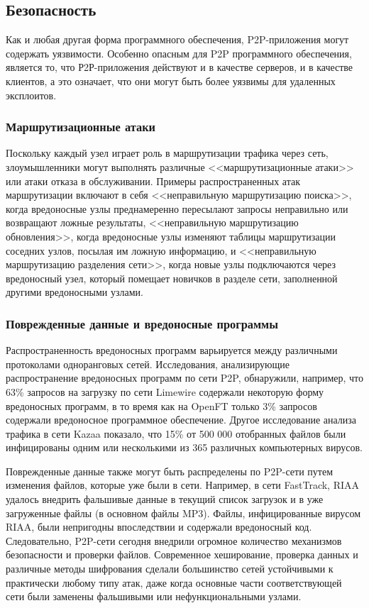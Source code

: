 \documentclass[bachelor, och, coursework]{SCWorks}
\begin{document}
\subsection{Безопасность}
Как и любая другая форма программного обеспечения, P2P-приложения могут содержать уязвимости. 
Особенно опасным для P2P программного обеспечения, является то, что Р2Р-приложения действуют и в качестве серверов, и в качестве клиентов, а это означает, что они могут быть более уязвимы для удаленных эксплоитов.

\subsubsection{Маршрутизационные атаки}
Поскольку каждый узел играет роль в маршрутизации трафика через сеть, злоумышленники могут выполнять различные <<маршрутизационные атаки>> или атаки отказа в обслуживании. Примеры распространенных атак маршрутизации включают в себя <<неправильную маршрутизацию поиска>>, когда вредоносные узлы преднамеренно пересылают запросы неправильно или возвращают ложные результаты, <<неправильную маршрутизацию обновления>>, когда вредоносные узлы изменяют таблицы маршрутизации соседних узлов, посылая им ложную информацию, и <<неправильную маршрутизацию разделения сети>>, когда новые узлы подключаются через вредоносный узел, который помещает новичков в разделе сети, заполненной другими вредоносными узлами.

\subsubsection{Поврежденные данные и вредоносные программы}
Распространенность вредоносных программ варьируется между различными протоколами одноранговых сетей. 
Исследования, анализирующие распространение вредоносных программ по сети P2P, обнаружили, например, что 63\% запросов на загрузку по сети Limewire содержали некоторую форму вредоносных программ, в то время как на OpenFT только 3\% запросов содержали вредоносное программное обеспечение. Другое исследование анализа трафика в сети Kazaa показало, что 15\% от 500 000 отобранных файлов были инфицированы одним или несколькими из 365 различных компьютерных вирусов.

Поврежденные данные также могут быть распределены по P2P-сети путем изменения файлов, которые уже были в сети. 
Например, в сети FastTrack, RIAA удалось внедрить фальшивые данные в текущий список загрузок и в уже загруженные файлы (в основном файлы MP3). 
Файлы, инфицированные вирусом RIAA, были непригодны впоследствии и содержали вредоносный код. 
Следовательно, P2P-сети сегодня внедрили огромное количество механизмов безопасности и проверки файлов. 
Современное хеширование, проверка данных и различные методы шифрования сделали большинство сетей устойчивыми к 
практически любому типу атак, даже когда основные части соответствующей сети были заменены фальшивыми или нефункциональными узлами.
\end{document}

